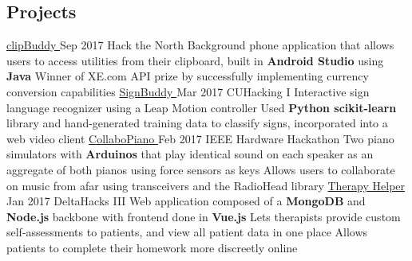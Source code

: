 \documentclass[]{aanguyen_res}
\begin{document}
\begin{main}
		\section{Projects}
			\vspace{0.1cm}%
			\mainentry%
				{\href{https://github.com/kumailn/clipBuddy}{clipBuddy {\faGithub}}}%
				{Sep 2017}%
				{Hack the North}%
				{\faCaretRight Background phone application that allows users to access utilities from their clipboard, built in \textbf{Android Studio} using \textbf{Java}
				\faCaretRight Winner of XE.com API prize by successfully implementing currency conversion capabilities}
			\vspace{0.1cm}%
			\mainentry%
				{\href{https://github.com/aanguyen/SignBuddy}{SignBuddy {\faGithub}}}%
				{Mar 2017}%
				{CUHacking I}%
				{\faCaretRight Interactive sign language recognizer using a Leap Motion controller 
				\faCaretRight Used \textbf{Python scikit-learn} library and hand-generated training data to classify signs, incorporated into a web video client}
			\vspace{0.1cm}%
			\mainentry%
				{\href{https://github.com/aanguyen/collaboPiano}{CollaboPiano {\faGithub}}}%
				{Feb 2017}%
				{IEEE Hardware Hackathon}%
				{\faCaretRight Two piano simulators with \textbf{Arduinos} that play identical sound on each speaker as an aggregate of both pianos using force sensors as keys
				\faCaretRight Allows users to collaborate on music from afar using transceivers and the RadioHead library}
			\vspace{0.1cm}%
			\mainentry%
				{\href{https://github.com/dtong1113/TherapyHelper}{Therapy Helper {\faGithub}}}%
				{Jan 2017}%
				{DeltaHacks III}%
				{\faCaretRight Web application composed of a \textbf{MongoDB} and \textbf{Node.js} backbone with frontend done in \textbf{Vue.js}
				\faCaretRight Lets therapists provide custom self-assessments to patients, and view all patient data in one place
				\faCaretRight Allows patients to complete their homework more discreetly online}

\end{main}
\end{document}
